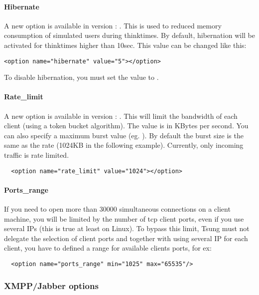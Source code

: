 \documentclass{TSUNG-en}
\begin{document}
\paragraph{Hibernate}

A new option is available in version : . This
is used to reduced memory consumption of simulated users during
thinktimes. By default, hibernation will be activated for thinktimes
higher than 10sec. This value can be changed like this:

\begin{Verbatim}
<option name="hibernate" value="5"></option>
\end{Verbatim}

To disable hibernation, you must set the value to .

\paragraph{Rate\_limit}

A new option is available in version :
. This will limit the bandwidth of each client
(using a token bucket algorithm). The value is in KBytes per
second. You can also specify a maximum burst value
(eg. ). By default the burst size is the same as
the rate (1024KB in the following example). Currently, only incoming
traffic is rate limited.

\begin{Verbatim}
  <option name="rate_limit" value="1024"></option>
\end{Verbatim}

\paragraph{Ports\_range}
If you need to open more than 30000 simultaneous connections on a
client machine, you will be limited by the number of tcp client ports,
even if you use several IPs (this is true at least on Linux). To
bypass this limit, Tsung must not delegate the selection of client
ports and together with using several IP for each client,
you have to defined a range for available clients ports, for ex:
\begin{Verbatim}
  <option name="ports_range" min="1025" max="65535"/>
\end{Verbatim}

\subsubsection{XMPP/Jabber options}
\label{sec:jabber-options}
\end{document}
